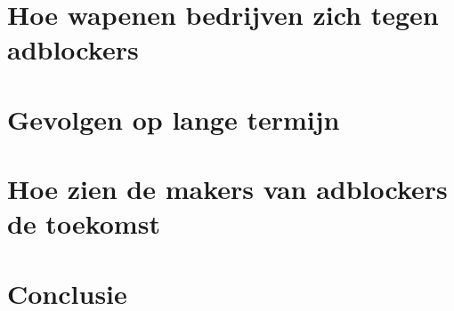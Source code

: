 \documentclass[pdftex,a4paper,12pt,twoside]{report}
\begin{document}
\chapter{Hoe wapenen bedrijven zich tegen adblockers}
\label{ch:Hoe wapenen bedrijven zich tegen adblockers}
\chapter{Gevolgen op lange termijn}
\label{ch:Gevolgen op lange termijn}
\chapter{Hoe zien de makers van adblockers de toekomst}
\label{ch:Hoe zien de makers van adblockers de toekomst}

\chapter{Conclusie}
\label{ch:conclusie}








\listoffigures
\listoftables
\end{document}
